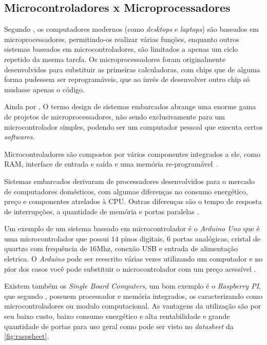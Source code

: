 \subsection{Microcontroladores x Microprocessadores}
\label{Sect:Micros}


Segundo , os computadores modernos (como \textit{desktops} e \textit{laptops}) são baseados em microprocessadores, permitindo-os realizar várias funções, enquanto outros sistemas baseados em microcontroladores, são limitados a apenas um ciclo repetido da mesma tarefa. Os microprocessadores foram originalmente desenvolvidos para substituir as primeiras calculadoras, com chips que de alguma forma pudessem ser reprogramáveis, que ao invés de desenvolver outro chip só mudasse apenas o código.

Ainda por , O termo design de sistemas embarcados abrange uma enorme gama de projetos de microprocessadores, não sendo exclusivamente para um microcontrolador simples, podendo ser um computador pessoal que executa certos \textit{softwares}.\par Microcontroladores são compostos por vários componentes integrados a ele, como RAM, interface de entrada e saída e uma memória re-programável~\cite{white:2011}.


Sistemas embarcados derivaram de processadores desenvolvidos para o mercado de computadores domésticos, com algumas diferenças no consumo energético, preço e componentes atrelados à CPU. Outras diferenças são o tempo de resposta de interrupções, a quantidade de memória e portas paralelas \cite{schlett:1998}.

Um exemplo de um sistema baseado em microcontrolador é o \textit{Arduino Uno} \cite{Arduino2018ArduinoRev3} que é uma microcontrolador que possui $14$ pinos digitais, $6$ portas analógicas, cristal de quartzo com frequência de $16$Mhz, conexão USB e entrada de alimentação eletrica. O \textit{Arduino} pode ser reescrito várias vezes utilizando um computador e no pior dos casos você pode substituir o microcontrolador com um preço acessível \cite{Arduino2018ArduinoRev3}.


Existem também os \textit{Single Board Computers}, um bom exemplo é o \textit{Raspberry PI}, que segundo , possuem processador e memória integrados, os caracterizando como microcontroladores ou modulo computacional. As vantagens da utilização são por seu baixo custo, baixo consumo energético e alta rentabilidade e grande quantidade de portas para uso geral como pode ser visto no \textit{datasheet} da \autoref{fig:raspsheet}. 


